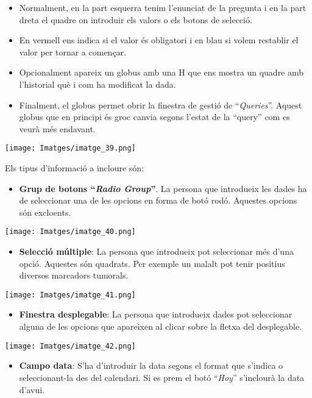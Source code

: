 \documentclass[
]{article}
\providecommand{\tightlist}{%
  \setlength{\itemsep}{0pt}\setlength{\parskip}{0pt}}
\begin{document}
\begin{itemize}
\tightlist
\item
  Normalment, en la part esquerra tenim l'enunciat de la pregunta i en la part dreta el quadre on introduir els valors o els botons de selecció.
\item
  En vermell ens indica si el valor és obligatori i en blau si volem restablir el valor per tornar a començar.
\item
  Opcionalment apareix un globus amb una H que ens mostra un quadre amb l'historial què i com ha modificat la dada.
\item
  Finalment, el globus permet obrir la finestra de gestió de ``\emph{Queries}''. Aquest globus que en principi és groc canvia segons l'estat de la ``query'' com es veurà més endavant.
\end{itemize}

\texttt{[image: Imatges/imatge\_39.png]}

Els tipus d'informació a incloure són:

\begin{itemize}
\tightlist
\item
  \textbf{Grup de botons ``\emph{Radio Group}''}. La persona que introdueix les dades ha de seleccionar una de les opcions en forma de botó rodó. Aquestes opcions són excloents.
\end{itemize}

\texttt{[image: Imatges/imatge\_40.png]}

\begin{itemize}
\tightlist
\item
  \textbf{Selecció múltiple}: La persona que introdueix pot seleccionar més d'una opció. Aquestes són quadrats. Per exemple un malalt pot tenir positius diversos marcadors tumorals.
\end{itemize}

\texttt{[image: Imatges/imatge\_41.png]}

\begin{itemize}
\tightlist
\item
  \textbf{Finestra desplegable}: La persona que introdueix dades pot seleccionar alguna de les opcions que apareixen al clicar sobre la fletxa del desplegable.
\end{itemize}

\texttt{[image: Imatges/imatge\_42.png]}

\begin{itemize}
\tightlist
\item
  \textbf{Campo data}: S'ha d'introduir la data segons el format que s'indica o seleccionant-la des del calendari. Si es prem el botó ``\emph{Hoy}'' s'inclourà la data d'avui.
\end{itemize}
\end{document}
